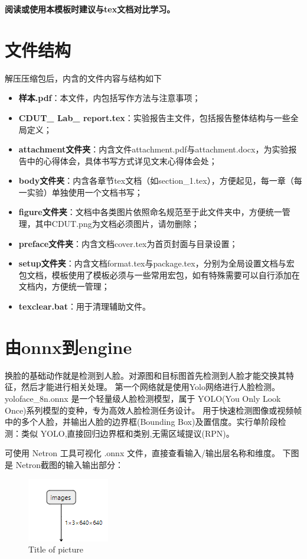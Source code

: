 \begin{itemize}
\textbf{阅读或使用本模板时建议与tex文档对比学习。}

\section{文件结构}
解压压缩包后，内含的文件内容与结构如下
\begin{itemize}
\item \textbf{样本.pdf}：本文件，内包括写作方法与注意事项；
\item \textbf{CDUT\_ Lab\_ report.tex}：实验报告主文件，包括报告整体结构与一些全局定义；
\item \textbf{attachment文件夹}：内含文件attachment.pdf与attachment.docx，为实验报告中的心得体会，具体书写方式详见文末心得体会处；
\item \textbf{body文件夹}：内含各章节tex文档（如section\_1.tex），方便起见，每一章（每一实验）单独使用一个文档书写；
\item \textbf{figure文件夹}：文档中各类图片依照命名规范至于此文件夹中，方便统一管理，其中CDUT.png为文档必须图片，请勿删除；
\item \textbf{preface文件夹}：内含文档cover.tex为首页封面与目录设置；
\item \textbf{setup文件夹}：内含文档format.tex与package.tex，分别为全局设置文档与宏包文档，模板使用了模板必须与一些常用宏包，如有特殊需要可以自行添加在文档内，方便统一管理；
\item \textbf{texclear.bat}：用于清理辅助文件。
\end{itemize}

\section{由onnx到engine}
换脸的基础动作就是检测到人脸。对源图和目标图首先检测到人脸才能交换其特征，然后才能进行相关处理。
第一个网络就是使用Yolo网络进行人脸检测。
yoloface_8n.onnx 是一个轻量级人脸检测模型，属于 YOLO(You Only Look Once)系列模型的变种，专为高效人脸检测任务设计。
用于快速检测图像或视频帧中的多个人脸，并输出人脸的边界框(Bounding Box)及置信度。实行单阶段检测：类似 YOLO,直接回归边界框和类别,无需区域提议(RPN)。

可使用 Netron 工具可视化 .onnx 文件，直接查看输入/输出层名称和维度。
下图是 Netron截图的输入输出部分：
\begin{figure}[H]
\centering
\includegraphics{figures/inputs.png}
\caption{Title of picture}
\end{figure}


\end{itemize}
